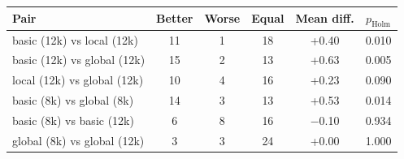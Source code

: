\begin{tabular}{lccccc}
\toprule
Pair & Better & Worse & Equal & Mean diff. & $p_\text{Holm}$ \\
\midrule
basic (12k) vs local (12k) & 11 & 1 & 18 & +0.40 & 0.010 \\
basic (12k) vs global (12k) & 15 & 2 & 13 & +0.63 & 0.005 \\
local (12k) vs global (12k) & 10 & 4 & 16 & +0.23 & 0.090 \\
basic (8k) vs global (8k) & 14 & 3 & 13 & +0.53 & 0.014 \\
basic (8k) vs basic (12k) & 6 & 8 & 16 & $-$0.10 & 0.934 \\
global (8k) vs global (12k) & 3 & 3 & 24 & +0.00 & 1.000 \\
\bottomrule
\end{tabular}

